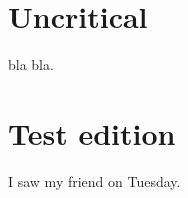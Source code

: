 \documentclass{memoir}
\begin{document}
\section{Uncritical}
bla bla.
\section{Test edition}
\beginnumbering
\pstart I saw my friend   on Tuesday.
\pend
\endnumbering
\end{document}
